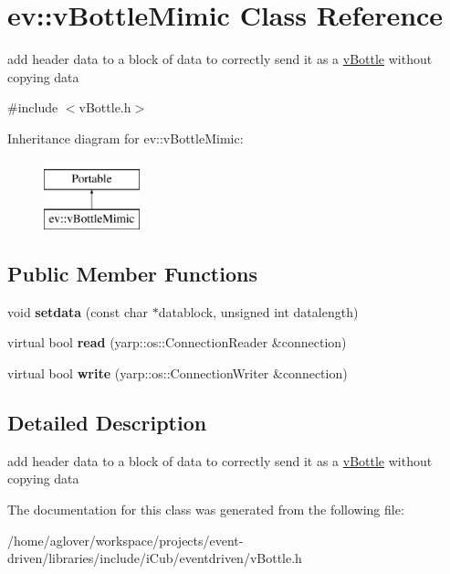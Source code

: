 \hypertarget{classev_1_1vBottleMimic}{}\section{ev\+:\+:v\+Bottle\+Mimic Class Reference}
\label{classev_1_1vBottleMimic}


add header data to a block of data to correctly send it as a \hyperlink{classev_1_1vBottle}{v\+Bottle} without copying data  




{\ttfamily \#include $<$v\+Bottle.\+h$>$}

Inheritance diagram for ev\+:\+:v\+Bottle\+Mimic\+:\begin{figure}[H]
\begin{center}
\leavevmode
\includegraphics[height=2.000000cm]{classev_1_1vBottleMimic}
\end{center}
\end{figure}
\subsection*{Public Member Functions}
\begin{DoxyCompactItemize}
\item 
void {\bfseries setdata} (const char $\ast$datablock, unsigned int datalength)\hypertarget{classev_1_1vBottleMimic_a03c64a63225e333a11b2693213f44165}{}\label{classev_1_1vBottleMimic_a03c64a63225e333a11b2693213f44165}

\item 
virtual bool {\bfseries read} (yarp\+::os\+::\+Connection\+Reader \&connection)\hypertarget{classev_1_1vBottleMimic_a5c7ead7b0484b9abe99e922196c074ff}{}\label{classev_1_1vBottleMimic_a5c7ead7b0484b9abe99e922196c074ff}

\item 
virtual bool {\bfseries write} (yarp\+::os\+::\+Connection\+Writer \&connection)\hypertarget{classev_1_1vBottleMimic_a39ad9b924890d8f8f717f49b6c5ad23f}{}\label{classev_1_1vBottleMimic_a39ad9b924890d8f8f717f49b6c5ad23f}

\end{DoxyCompactItemize}


\subsection{Detailed Description}
add header data to a block of data to correctly send it as a \hyperlink{classev_1_1vBottle}{v\+Bottle} without copying data 

The documentation for this class was generated from the following file\+:\begin{DoxyCompactItemize}
\item 
/home/aglover/workspace/projects/event-\/driven/libraries/include/i\+Cub/eventdriven/v\+Bottle.\+h\end{DoxyCompactItemize}
